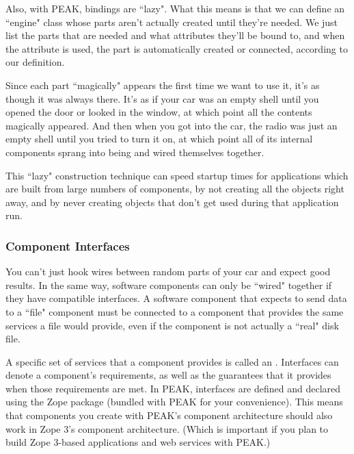 Also, with PEAK, bindings are ``lazy".  What this means is that we can define
an ``engine" class whose parts aren't actually created until they're needed.
We just list the parts that are needed and what attributes they'll be bound
to, and when the attribute is used, the part is automatically created or
connected, according to our definition.

Since each part ``magically" appears the first time we want to use it, it's
as though it was always there.  It's as if your car was an empty shell until
you opened the door or looked in the window, at which point all the contents
magically appeared.  And then when you got into the car, the radio was just
an empty shell until you tried to turn it on, at which point all of its
internal components sprang into being and wired themselves together.

This ``lazy" construction technique can speed startup times for applications
which are built from large numbers of components, by not creating all the
objects right away, and by never creating objects that don't get used during
that application run.










\subsubsection{Component Interfaces}

You can't just hook wires between random parts of your car and expect good
results.  In the same way, software components can only be ``wired" together
if they have compatible interfaces.  A software component that expects to
send data to a ``file" component must be connected to a component that
provides the same services a file would provide, even if the component is not
actually a ``real" disk file.

A specific set of services that a component provides is called an
.  Interfaces can denote a component's requirements, as well
as the guarantees that it provides when those requirements are met.  In PEAK,
interfaces are defined and declared using the Zope  package
(bundled with PEAK for your convenience).   This means that components you
create with PEAK's component architecture should also work in Zope 3's
component architecture.  (Which is important if you plan to build Zope
3-based applications and web services with PEAK.)

